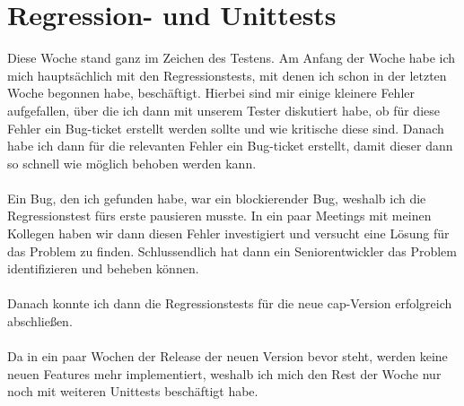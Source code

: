 \section{Regression- und Unittests}
Diese Woche stand ganz im Zeichen des Testens. Am Anfang der Woche habe ich mich hauptsächlich mit den Regressionstests, mit denen ich schon in der letzten Woche begonnen habe, beschäftigt. Hierbei sind mir einige kleinere Fehler aufgefallen, über die ich dann mit unserem Tester diskutiert habe, ob für diese Fehler ein Bug-ticket erstellt werden sollte und wie kritische diese sind. Danach habe ich dann für die relevanten Fehler ein Bug-ticket erstellt, damit dieser dann so schnell wie möglich behoben werden kann. \\\\
Ein Bug, den ich gefunden habe, war ein blockierender Bug, weshalb ich die Regressionstest fürs erste pausieren musste. In ein paar Meetings mit meinen Kollegen haben wir dann diesen Fehler investigiert und versucht eine Lösung für das Problem zu finden. Schlussendlich hat dann ein Seniorentwickler das Problem identifizieren und beheben können. \\\\
Danach konnte ich dann die Regressionstests für die neue \acs{cap}-Version erfolgreich abschließen. \\\\
Da in ein paar Wochen der Release der neuen Version bevor steht, werden keine neuen Features mehr implementiert, weshalb ich mich den Rest der Woche nur noch mit weiteren Unittests beschäftigt habe. \\\\

